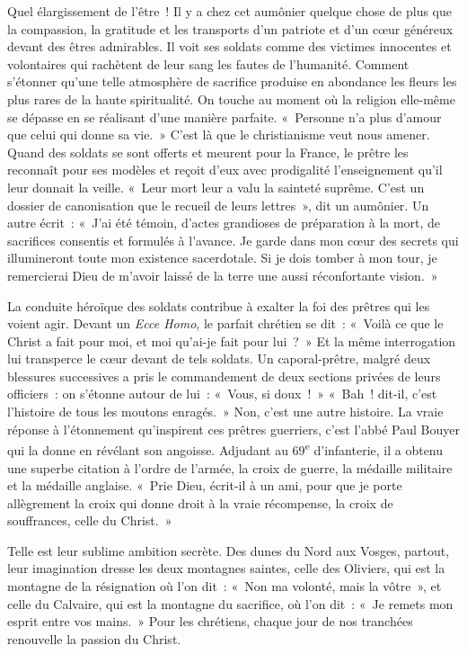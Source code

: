 \documentclass[french,twoside]{book} %
\begin{document}
\noindent Quel élargissement de l’être ! Il y a chez cet aumônier quelque chose de plus que la compassion, la gratitude et les transports d’un patriote et d’un cœur généreux devant des êtres admirables. Il voit ses soldats comme des victimes innocentes et volontaires qui rachètent de leur sang les fautes de l’humanité. Comment s’étonner qu’une telle atmosphère de sacrifice produise en abondance les fleurs les plus rares de la haute spiritualité. On touche au moment où la religion elle-même se dépasse en se réalisant d’une manière parfaite. « Personne n’a plus d’amour que celui qui donne sa vie. » C’est là que le christianisme veut nous amener. Quand des soldats se sont offerts et meurent pour la France, le prêtre les reconnaît pour ses modèles et reçoit d’eux avec prodigalité l’enseignement qu’il leur donnait la veille. « Leur mort leur a valu la sainteté suprême. C’est un dossier de canonisation que le recueil de leurs lettres », dit un aumônier. Un autre écrit : « J’ai été témoin, d’actes grandioses de préparation à la mort, de sacrifices consentis et formulés à l’avance. Je garde dans mon cœur des secrets qui illumineront toute mon existence sacerdotale. Si je dois tomber à mon tour, je remercierai Dieu de m’avoir laissé de la terre une aussi réconfortante vision. » ‌\par
La conduite héroïque des soldats contribue à exalter la foi des prêtres qui les voient agir. Devant un {\itshape Ecce Homo}, le parfait chrétien se dit : « Voilà ce que le Christ a fait pour moi, et moi qu’ai-je fait pour lui ? » Et la même interrogation lui transperce le cœur devant de tels soldats. Un caporal-prêtre, malgré deux blessures successives a pris le commandement de deux sections privées de leurs officiers : on s’étonne autour de lui : « Vous, si doux ! » « Bah ! dit-il, c’est l’histoire de tous les moutons enragés. » Non, c’est une autre histoire. La vraie réponse à l’étonnement qu’inspirent ces prêtres guerriers, c’est l’abbé Paul Bouyer qui la donne en révélant son angoisse. Adjudant au 69\textsuperscript{e} d’infanterie, il a obtenu une superbe citation à l’ordre de l’armée, la croix de guerre, la médaille militaire et la médaille anglaise. « Prie Dieu, écrit-il à un ami, pour que je porte allègrement la croix qui donne droit à la vraie récompense, la croix de souffrances, celle du Christ. »\par
Telle est leur sublime ambition secrète. Des dunes du Nord aux Vosges, partout, leur imagination dresse les deux montagnes saintes, celle des Oliviers, qui est la montagne de la résignation où l’on dit : « Non ma volonté, mais la vôtre », et celle du Calvaire, qui est la montagne du sacrifice, où l’on dit : « Je remets mon esprit entre vos mains. » Pour les chrétiens, chaque jour de nos tranchées renouvelle la passion du Christ.‌\par
\end{document}
